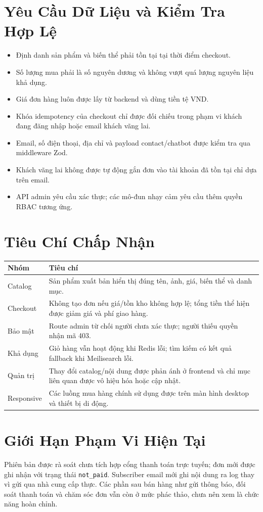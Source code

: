 \section{Yêu Cầu Dữ Liệu và Kiểm Tra Hợp Lệ}

\begin{itemize}[leftmargin=2em, itemsep=4pt]
  \item Định danh sản phẩm và biến thể phải tồn tại tại thời điểm checkout.
  \item Số lượng mua phải là số nguyên dương và không vượt quá lượng nguyên liệu khả dụng.
  \item Giá đơn hàng luôn được lấy từ backend và dùng tiền tệ VND.
  \item Khóa idempotency của checkout chỉ được đối chiếu trong phạm vi khách đang đăng nhập hoặc email khách vãng lai.
  \item Email, số điện thoại, địa chỉ và payload contact/chatbot được kiểm tra qua middleware Zod.
  \item Khách vãng lai không được tự động gắn đơn vào tài khoản đã tồn tại chỉ dựa trên email.
  \item API admin yêu cầu xác thực; các mô-đun nhạy cảm yêu cầu thêm quyền RBAC tương ứng.
\end{itemize}

\section{Tiêu Chí Chấp Nhận}

\begin{longtable}{@{}L{0.28\textwidth} L{0.64\textwidth}@{}}
  \toprule
  \textbf{Nhóm} & \textbf{Tiêu chí} \\
  \midrule
  \endhead
  Catalog & Sản phẩm xuất bản hiển thị đúng tên, ảnh, giá, biến thể và danh mục. \\
  Checkout & Không tạo đơn nếu giá/tồn kho không hợp lệ; tổng tiền thể hiện được giảm giá và phí giao hàng. \\
  Bảo mật & Route admin từ chối người chưa xác thực; người thiếu quyền nhận mã 403. \\
  Khả dụng & Giỏ hàng vẫn hoạt động khi Redis lỗi; tìm kiếm có kết quả fallback khi Meilisearch lỗi. \\
  Quản trị & Thay đổi catalog/nội dung được phản ánh ở frontend và chỉ mục liên quan được vô hiệu hóa hoặc cập nhật. \\
  Responsive & Các luồng mua hàng chính sử dụng được trên màn hình desktop và thiết bị di động. \\
  \bottomrule
\end{longtable}

\section{Giới Hạn Phạm Vi Hiện Tại}

Phiên bản được rà soát chưa tích hợp cổng thanh toán trực tuyến; đơn mới được ghi nhận với trạng thái \texttt{not\_paid}. Subscriber email mới ghi nội dung ra log thay vì gửi qua nhà cung cấp thực. Các phần sau bán hàng như gửi thông báo, đối soát thanh toán và chăm sóc đơn vẫn còn ở mức phác thảo, chưa nên xem là chức năng hoàn chỉnh.
